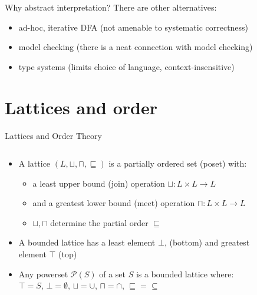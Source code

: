 \documentclass[aspectratio=169]{beamer}
\begin{document}
\begin{frame}{Why abstract interpretation?}
There are other alternatives:
\begin{itemize}
\item ad-hoc, iterative DFA (not amenable to systematic correctness)
\item model checking (there is a neat connection with model checking)
\item type systems (limits choice of language, context-insensitive)
\end{itemize}
\end{frame}

\section{Lattices and order}
\begin{frame}{Lattices and Order Theory}
  \begin{columns}
  \begin{column}{0.5\textwidth}
  \begin{itemize}
  \item A lattice $(L, \sqcup, \sqcap, \sqsubseteq)$ is a partially ordered set (poset) with:
    \begin{itemize}
    \item a least upper bound (join) operation $\sqcup: L \times L \rightarrow L$
    \item and a greatest lower bound (meet) operation $\sqcap: L \times L \rightarrow L$
    \item $\sqcup, \sqcap$ determine the partial order $\sqsubseteq$
    \end{itemize}
  \item<9-> A bounded lattice has a least element $\bot$, (bottom)
    and greatest element $\top$ (top)
  \item<10-> Any powerset $\mathcal{P}(S)$ of a set $S$ is a bounded lattice where:
     $\top = S$,
     $\bot = \emptyset$,
     $\sqcup = \cup$,
     $\sqcap = \cap$,
     $\sqsubseteq = \subseteq$
  \end{itemize}
  \end{column}
  \begin{column}{0.5\textwidth}
  \begin{figure}[t]
    \centering
\end{figure}
\end{column}
\end{columns}
\end{frame}
\end{document}
